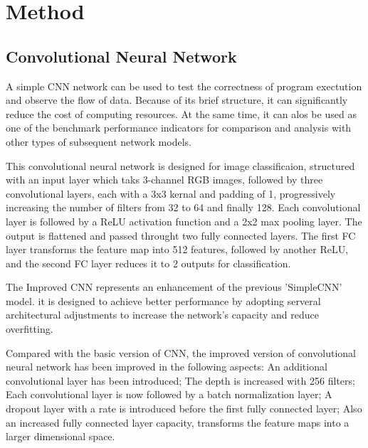 \documentclass[final]{cvpr}
\begin{document}
\section{Method}

\subsection{Convolutional Neural Network}
A simple CNN network can be used to test the correctness of program exectution and observe the flow of data. Because of its brief structure, it can significantly reduce the cost of computing resources. At the same time, it can alos be used as one of the benchmark performance indicators for comparison and analysis with other types of subsequent network models.

This convolutional neural network is designed for image classificaion, structured with an input layer which taks 3-channel RGB images, followed by three convolutional layers, each with a 3x3 kernal and padding of 1, progressively increasing the number of filters from 32 to 64 and finally 128. Each convolutional layer is followed by a ReLU activation function and a 2x2 max pooling layer. The output is flattened and passed throught two fully connected layers. The first FC layer transforms the feature map into 512 features, followed by another ReLU, and the second FC layer reduces it to 2 outputs for classification. 

The Improved CNN represents an enhancement of the previous 'SimpleCNN' model. it is designed to achieve better performance by adopting serveral architectural adjustments to increase the network's capacity and reduce overfitting.

Compared with the basic version of CNN, the improved version of convolutional neural network has been improved in the following aspects: An additional convolutional layer has been introduced; The depth is increased with 256 filters; Each convolutional layer is now followed by a batch normalization layer; A dropout layer with a rate is introduced before the first fully connected layer; Also an increased fully connected layer capacity, transforms the feature maps into a larger dimensional space.
\end{document}
